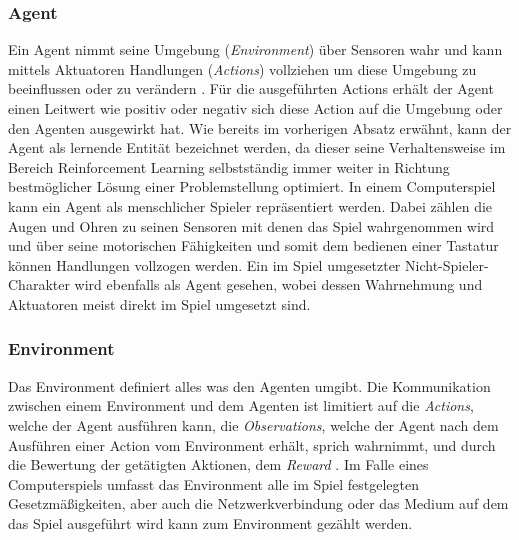 \documentclass[11pt]{scrartcl}
\begin{document}
\subsubsection{Agent}
Ein Agent nimmt seine Umgebung (\textit{Environment}) über Sensoren wahr und kann mittels Aktuatoren
Handlungen (\textit{Actions}) vollziehen um diese Umgebung zu beeinflussen oder zu verändern 
\cite[~S.60]{RN2009}. Für die ausgeführten Actions erhält der Agent einen Leitwert wie positiv oder
negativ sich diese Action auf die Umgebung oder den Agenten ausgewirkt hat. Wie bereits im vorherigen
Absatz erwähnt, kann der Agent als lernende Entität bezeichnet werden, da dieser seine Verhaltensweise
im Bereich  Reinforcement Learning selbstständig immer weiter in Richtung bestmöglicher Lösung einer 
Problemstellung optimiert. In einem Computerspiel kann ein Agent als menschlicher Spieler
repräsentiert werden. Dabei zählen die Augen und Ohren zu seinen Sensoren mit denen das Spiel
wahrgenommen wird und über seine motorischen Fähigkeiten und somit dem bedienen einer Tastatur
können Handlungen vollzogen werden. Ein im Spiel umgesetzter Nicht-Spieler-Charakter wird ebenfalls
als Agent gesehen, wobei dessen Wahrnehmung und Aktuatoren meist direkt im Spiel umgesetzt sind.


\subsubsection{Environment}
Das Environment definiert alles was den Agenten umgibt. Die Kommunikation zwischen einem Environment
und dem Agenten ist limitiert auf die \textit{Actions}, welche der Agent ausführen kann, die 
\textit{Observations}, welche der Agent nach dem Ausführen einer Action vom Environment erhält, 
sprich wahrnimmt, und durch die Bewertung der getätigten Aktionen, dem \textit{Reward} 
\cite[~S.5]{L2018}. Im Falle eines Computerspiels umfasst das Environment alle im Spiel festgelegten
Gesetzmäßigkeiten, aber auch die Netzwerkverbindung oder das Medium auf dem das Spiel ausgeführt
wird kann zum Environment gezählt werden.
\end{document}
